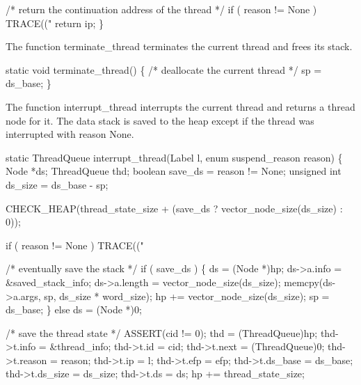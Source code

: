     /* return the continuation address of the thread */
    if ( reason != None )
        TRACE(("%
    return ip;
\}

\nwendcode{}\nwdocspar
The function {\Tt{}terminate{\_}thread\nwendquote} terminates the current thread and frees
its stack.

\nwenddocs{}\plusendmoddef\nwstartdeflinemarkup{}\nwenddeflinemarkup
static void
terminate_thread()
\{
    /* deallocate the current thread */
    sp  = ds_base;
\}

\nwendcode{}\nwdocspar
The function {\Tt{}interrupt{\_}thread\nwendquote} interrupts the current thread and
returns a thread node for it. The data stack is saved to the heap
except if the thread was interrupted with reason {\Tt{}None\nwendquote}.

\nwenddocs{}\plusendmoddef\nwstartdeflinemarkup{}\nwenddeflinemarkup
static ThreadQueue
interrupt_thread(Label l, enum suspend_reason reason)
\{
    Node         *ds;
    ThreadQueue  thd;
    boolean      save_ds = reason != None;
    unsigned int ds_size = ds_base - sp;

    CHECK_HEAP(thread_state_size + (save_ds ? vector_node_size(ds_size) : 0));

    if ( reason != None )
        TRACE(("%

    /* eventually save the stack */
    if ( save_ds )
    \{
        ds           = (Node *)hp;
        ds->a.info   = &saved_stack_info;
        ds->a.length = vector_node_size(ds_size);
        memcpy(ds->a.args, sp, ds_size * word_size);
        hp          += vector_node_size(ds_size);
        sp           = ds_base;
    \}
    else
        ds = (Node *)0;

    /* save the thread state */
    ASSERT(cid != 0);
    thd            = (ThreadQueue)hp;
    thd->t.info    = &thread_info;
    thd->t.id      = cid;
    thd->t.next    = (ThreadQueue)0;
    thd->t.reason  = reason;
    thd->t.ip      = l;
    thd->t.efp     = efp;
    thd->t.ds_base = ds_base;
    thd->t.ds_size = ds_size;
    thd->t.ds      = ds;
    hp            += thread_state_size;


